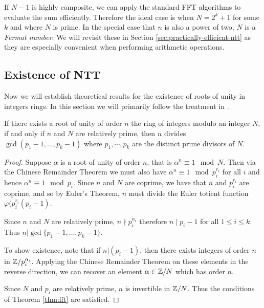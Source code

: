 If $N - 1$ is highly composite, we can apply the standard FFT algorithms to evaluate the sum efficiently. Therefore the ideal case is when $N = 2^k + 1$ for some $k$ and where $N$ is prime. In the special case that $n$ is also a power of two, $N$ is a \emph{Fermat number}. We will revisit these in Section \ref{sec:practically-efficient-ntt} as they are especially convenient when performing arithmetic operations.

\subsection{Existence of NTT}%
\label{sub:Existence of NTT}

Now we will establish theoretical results for the existence of roots of unity in integers rings.
In this section we will primarily follow the treatment in \cite{intro-to-fmt}.

\begin{theorem}\label{thm:fmt-transform-length}

    If there exists a root of unity of order $n$ the ring of integers modulo an integer $N$, if and only if $n$ and $N$ are relatively prime, then $n$ divides $\gcd(p_1 - 1, \ldots, p_k - 1)$ where $p_1, \cdots, p_k$ are the distinct prime divisors of $N$.
\end{theorem}

\begin{proof}
    Suppose $\alpha$ is a root of unity of order $n$, that is $\alpha^n \equiv 1 \mod N$. Then via the Chinese Remainder Theorem we must also have $\alpha^n \equiv 1 \mod p_i^{r_i}$ for all $i$ and hence $\alpha^n \equiv 1 \mod p_i$. Since $n$ and $N$ are coprime, we have that $n$ and $p_i^{r_i}$ are coprime, and so by Euler's Theorem, $n$ must divide the Euler totient function $\varphi(p_i^{r_i}(p_i - 1)$.

    Since $n$ and $N$ are relatively prime, $n \nmid p_i^{\alpha_i}$ therefore $n \mid p_i - 1$ for all $1 \le i \le k$. Thus $n | \gcd\{p_1 - 1, \ldots, p_k - 1\}$.

    \medskip

    To show existence, note that if $n | (p_i - 1)$, then there exists integers of order $n$ in ${\mathbb Z}/p_i^{\alpha_i}$. Applying the Chinese Remainder Theorem on these elements in the reverse direction, we can recover an element $\alpha \in {\mathbb Z}/N$ which has order $n$.

    \medskip

    Since $N$ and $p_i$ are relatively prime, $n$ is invertible in ${\mathbb Z}/N$. Thus the conditions of Theorem \ref{thm:fft} are satisfied.
\end{proof}

